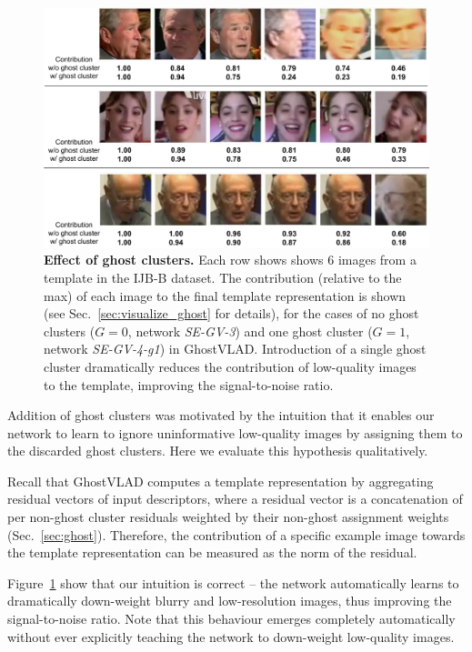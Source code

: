 \documentclass[runningheads]{llncs}
\begin{document}
\begin{figure}[t]
   \begin{center}
         \includegraphics[width=0.90\columnwidth]{images/norm.pdf}
   \end{center}
%
   \caption{\textbf{Effect of ghost clusters.}
Each row shows shows 6 images from a template in the IJB-B dataset.
The contribution (relative to the max) of each image
to the final template representation is shown
(see Sec.~\ref{sec:visualize_ghost} for details),
for the cases of no ghost clusters ($G=0$, network \emph{SE-GV-3})
and one ghost cluster ($G=1$, network \emph{SE-GV-4-g1})
in GhostVLAD.
Introduction of a single ghost cluster dramatically reduces
the contribution of low-quality images to the template,
improving the signal-to-noise ratio.
}
    \label{fig:score}
%
\end{figure}

Addition of ghost clusters was motivated by the intuition
that it enables our network to learn to ignore uninformative
low-quality images by assigning them to the discarded ghost clusters.
Here we evaluate this hypothesis qualitatively.

Recall that GhostVLAD computes a template representation
by aggregating residual vectors of input descriptors,
where a residual vector is a concatenation of
per non-ghost cluster residuals
%
weighted by their non-ghost assignment weights (Sec.~\ref{sec:ghost}).
Therefore, the contribution of a specific example image towards
the template representation can be measured as the norm of the residual.

Figure~\ref{fig:score} show that our intuition is correct --
the network automatically learns to dramatically down-weight
blurry and low-resolution images, thus improving the signal-to-noise ratio.
Note that this behaviour emerges completely automatically
without ever explicitly teaching the network to down-weight low-quality
images.
\end{document}
